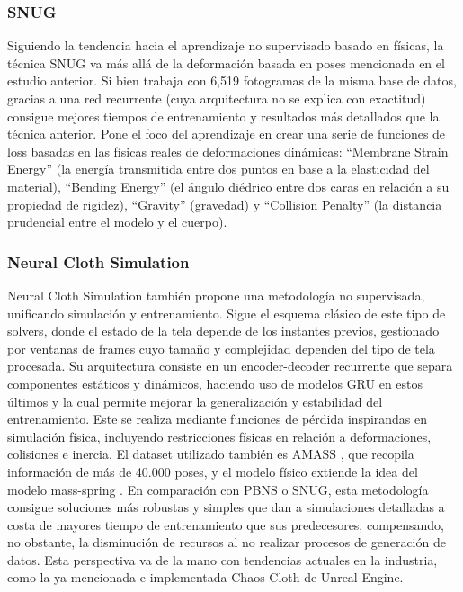 \subsubsection{SNUG}
Siguiendo la tendencia hacia el aprendizaje no supervisado basado en físicas, la técnica SNUG \cite{santesteban2022snug} va más allá de la deformación basada en poses mencionada en el estudio anterior. Si bien trabaja con 6,519 fotogramas de la misma base de datos, gracias a una red recurrente (cuya arquitectura no se explica con exactitud) consigue mejores tiempos de entrenamiento y resultados más detallados que la técnica anterior. Pone el foco del aprendizaje en crear una serie de funciones de loss basadas en las físicas reales de deformaciones dinámicas: ``Membrane Strain Energy'' (la energía transmitida entre dos puntos en base a la elasticidad del material), ``Bending Energy'' (el ángulo diédrico entre dos caras en relación a su propiedad de rigidez), ``Gravity'' (gravedad) y ``Collision Penalty'' (la distancia prudencial entre el modelo y el cuerpo).

\subsubsection{Neural Cloth Simulation} 
Neural Cloth Simulation \cite{bertiche2022neural} también propone una metodología no supervisada, unificando simulación y entrenamiento. Sigue el esquema clásico de este tipo de solvers, donde el estado de la tela depende de los instantes previos, gestionado por ventanas de frames cuyo tamaño y complejidad dependen del tipo de tela procesada. Su arquitectura consiste en un encoder-decoder recurrente que separa componentes estáticos y dinámicos, haciendo uso de modelos GRU en estos últimos y la cual permite mejorar la generalización y estabilidad del entrenamiento. Este se realiza mediante funciones de pérdida inspirandas en simulación física, incluyendo restricciones físicas en relación a deformaciones, colisiones e inercia. El dataset utilizado también es AMASS \cite{mahmood2019AMASS}, que recopila información de más de 40.000 poses, y el modelo físico extiende la idea del modelo mass-spring \cite{provot1995deformation}. En comparación con PBNS o SNUG, esta metodología consigue soluciones más robustas y simples que dan a simulaciones detalladas a costa de mayores tiempo de entrenamiento que sus predecesores, compensando, no obstante, la disminución de recursos al no realizar procesos de generación de datos. Esta perspectiva va de la mano con tendencias actuales en la industria, como la ya mencionada e implementada Chaos Cloth de Unreal Engine.


